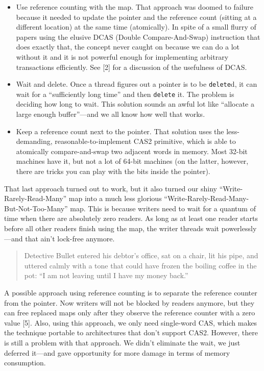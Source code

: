 \documentclass[a4paper,12pt,notitlepage,twoside,openright]{article}
\begin{document}
\begin{itemize}
\item Use reference counting with the map. That approach was doomed to failure because it needed to update the pointer and the reference count (sitting at a different location) at the same time (atomically). In spite of a small flurry of papers using the elusive DCAS (Double Compare-And-Swap) instruction that does exactly that, the concept never caught on because we can do a lot without it and it is not powerful enough for implementing arbitrary transactions efficiently. See [2] for a discussion of the usefulness of DCAS.
\item Wait and delete. Once a thread figures out a pointer is to be \texttt{delete}d, it can wait for a ``sufficiently long time'' and then \texttt{delete} it. The problem is deciding how long to wait. This solution sounds an awful lot like ``allocate a large enough buffer''---and we all know how well that works.
\item Keep a reference count next to the pointer. That solution uses the less-demanding, reasonable-to-implement CAS2 primitive, which is able to atomically compare-and-swap two adjacent words in memory. Most 32-bit machines have it, but not a lot of 64-bit machines (on the latter, however, there are tricks you can play with the bits inside the pointer).
\end{itemize}

That last approach turned out to work, but it also turned our shiny ``Write-Rarely-Read-Many'' map into a much less glorious ``Write-Rarely-Read-Many-But-Not-Too-Many'' map. This is because writers need to wait for a quantum of time when there are absolutely zero readers. As long as at least one reader starts before all other readers finish using the map, the writer threads wait powerlessly---and that ain't lock-free anymore.

\begin{quote}
Detective Bullet entered his debtor's office, sat on a chair, lit his pipe, and uttered calmly with a tone that could have frozen the boiling coffee in the pot: ``I am not leaving until I have my money back.''
\end{quote}

A possible approach using reference counting is to separate the reference counter from the pointer. Now writers will not be blocked by readers anymore, but they can free replaced maps only after they observe the reference counter with a zero value [5]. Also, using this approach, we only need single-word CAS, which makes the technique portable to architectures that don't support CAS2. However, there is still a problem with that approach. We didn't eliminate the wait, we just deferred it---and gave opportunity for more damage in terms of memory consumption.
\end{document}
